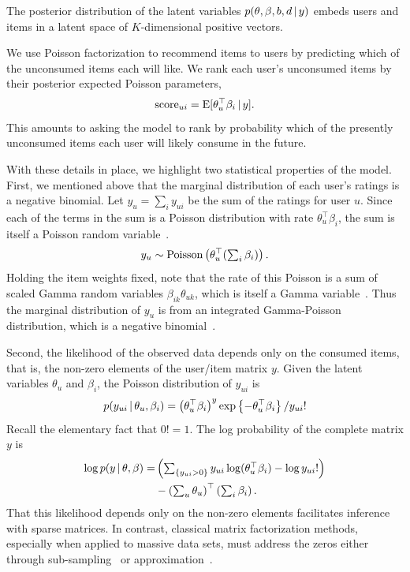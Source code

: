 \documentclass{sig-alternate}
\begin{document}
The posterior distribution of the latent variables $p(\theta, \beta,
b, d \,\vert\, y)$ embeds users and items in a latent space of
$K$-dimensional positive vectors. 

We use Poisson factorization to recommend items to users by predicting
which of the unconsumed items each will like.  We rank each user's
unconsumed items by their posterior expected Poisson parameters,
\begin{equation}
  \label{eq:score}
  \textrm{score}_{ui} = \textrm{E}[\theta_u^\top \beta_i \,\vert\, y].
\end{equation}
This amounts to asking the model to rank by probability which of the
presently unconsumed items each user will likely consume in the
future.

With these details in place, we highlight two statistical properties of the
model. First, we mentioned above that the marginal distribution of
each user's ratings is a negative binomial.  Let $y_{u} = \sum_{i}
y_{ui}$ be the sum of the ratings for user $u$.  Since each of the
terms in the sum is a Poisson distribution with rate $\theta_u^\top
\beta_i$, the sum is itself a Poisson random
variable~\cite{Johnson:2005}.
\begin{equation}
  y_u \sim \textrm{Poisson}\left(\theta_u^\top (\textstyle \sum_{i} \beta_{i})\right).
\end{equation}
Holding the item weights fixed, note that the rate of this Poisson is
a sum of scaled Gamma random variables $\beta_{ik} \theta_{uk}$, which is
itself a Gamma variable~\cite{Norman:1994}.  Thus the marginal
distribution of $y_u$ is from an integrated Gamma-Poisson
distribution, which is a negative binomial~\cite{Gelman:1995}.


Second, the likelihood of the observed data depends only on the
consumed items, that is, the non-zero elements of the user/item matrix
$y$.  Given the latent variables $\theta_u$ and $\beta_i$, the Poisson
distribution of $y_{ui}$ is
\begin{equation}
  p(y_{ui} \,\vert\, \theta_u, \beta_i) =
  \left(\theta_u^\top \beta_i\right)^y
  \exp\left\{-\theta_u^\top \beta_i \right\} / y_{ui}!
\end{equation}
Recall the elementary fact that $0! = 1$.  The log probability of the
complete matrix $y$ is
\begin{align}
  \log p(y \,\vert\, \theta, \beta) =
  & \left(\textstyle \sum_{\{y_{ui} > 0\}}
    y_{ui} \log (\theta_u^\top \beta_i) - \log y_{ui}!
  \right) \\
  & -
  \left(\textstyle\sum_{u} \theta_u\right)^\top \left(\textstyle
    \sum_{i} \beta_i\right).
\end{align}
That this likelihood depends only on the non-zero elements facilitates
inference with sparse matrices.  In contrast, classical matrix
factorization methods, especially when applied to
massive data sets, must address the zeros either through
sub-sampling~\cite{Dror:2012a} or approximation~\cite{Hu:2008p9402}.
\end{document}
